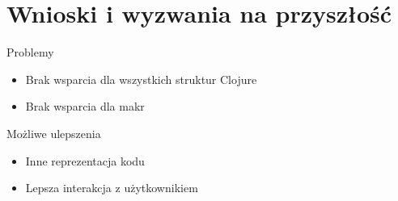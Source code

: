 \documentclass[presentation]{beamer}
\begin{document}
\section{Wnioski i wyzwania na przyszłość}
\label{sec-5}
\begin{frame}[label=sec-5-1]{Problemy}
\begin{itemize}
\item Brak wsparcia dla wszystkich struktur Clojure
\item Brak wsparcia dla makr
\end{itemize}
\end{frame}
\begin{frame}[label=sec-5-2]{Możliwe ulepszenia}
\begin{itemize}
\item Inne reprezentacja kodu
\item Lepsza interakcja z użytkownikiem
\end{itemize}
\end{frame}
\end{document}
